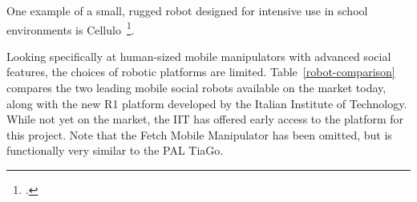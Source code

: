 \documentclass[11pt,a4paper]{report}
\begin{document}
One example of a small, rugged robot designed for intensive use in school
environments is Cellulo~\footcite{ozgur2017cellulo}.
%
%



Looking specifically at human-sized mobile manipulators with advanced social
features, the choices of robotic platforms are limited.
Table~\ref{robot-comparison} compares the two leading mobile social robots
available on the market today, along with the new R1 platform developed by the
Italian Institute of Technology. While not yet on the market, the IIT has
offered early access to the platform for this project. Note that the Fetch
Mobile Manipulator has been omitted, but is functionally very similar to the PAL
TiaGo.
\end{document}
